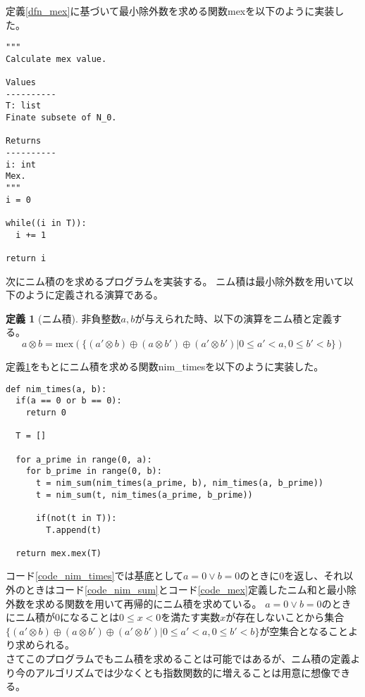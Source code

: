 \documentclass[uplatex,dvipdfmx,a4paper,10pt]{jsarticle}
\theoremstyle{definition}
\newtheorem{dfn}[thm]{定義}
\begin{document}
定義\ref{dfn_mex}に基づいて最小除外数を求める関数mexを以下のように実装した。

\begin{lstlisting}[caption={最小除外数を求める関数}, label=code_mex]
"""
Calculate mex value.

Values
----------
T: list
Finate subsete of N_0.

Returns
----------
i: int
Mex.
"""
i = 0

while((i in T)):
  i += 1

return i
\end{lstlisting}

次にニム積のを求めるプログラムを実装する。
ニム積は最小除外数を用いて以下のように定義される演算である。

\begin{dfn}[ニム積]
非負整数\(a, b\)が与えられた時、以下の演算をニム積と定義する。
\begin{equation}
a \otimes b = \text{mex}(\{(a' \otimes b) \oplus (a \otimes b') \oplus (a' \otimes b') | 0 \leq a' < a, 0 \leq b' < b\})
\end{equation}
\label{dfn_nim_times}
\end{dfn}

定義\ref{dfn_nim_times}をもとにニム積を求める関数nim\_timesを以下のように実装した。

\begin{lstlisting}[caption={ニム積を求める関数}, label=code_nim_times]
def nim_times(a, b):
  if(a == 0 or b == 0):
    return 0
  
  T = []
  
  for a_prime in range(0, a):
    for b_prime in range(0, b):
      t = nim_sum(nim_times(a_prime, b), nim_times(a, b_prime))
      t = nim_sum(t, nim_times(a_prime, b_prime))

      if(not(t in T)):
        T.append(t)

  return mex.mex(T)
\end{lstlisting}

コード\ref{code_nim_times}では基底として\(a = 0 \lor b = 0\)のときに\(0\)を返し、それ以外のときはコード\ref{code_nim_sum}とコード\ref{code_mex}定義したニム和と最小除外数を求める関数を用いて再帰的にニム積を求めている。
\(a = 0 \lor b = 0\)のときにニム積が\(0\)になることは\(0 \leq x < 0\)を満たす実数\(x\)が存在しないことから集合\(\{(a' \otimes b) \oplus (a \otimes b') \oplus (a' \otimes b') | 0 \leq a' < a, 0 \leq b' < b\}\)が空集合となることより求められる。\\
さてこのプログラムでもニム積を求めることは可能ではあるが、ニム積の定義より今のアルゴリズムでは少なくとも指数関数的に増えることは用意に想像できる。
\end{document}
